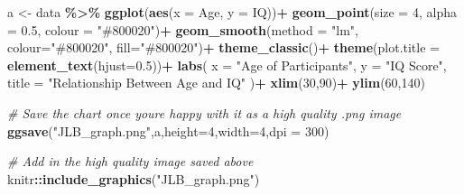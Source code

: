 \documentclass[
]{book}
\newenvironment{Shaded}{\begin{snugshade}}{\end{snugshade}}
\newcommand{\AttributeTok}[1]{\textcolor[rgb]{0.13,0.29,0.53}{#1}}
\newcommand{\CommentTok}[1]{\textcolor[rgb]{0.56,0.35,0.01}{\textit{#1}}}
\newcommand{\DecValTok}[1]{\textcolor[rgb]{0.00,0.00,0.81}{#1}}
\newcommand{\FloatTok}[1]{\textcolor[rgb]{0.00,0.00,0.81}{#1}}
\newcommand{\FunctionTok}[1]{\textcolor[rgb]{0.13,0.29,0.53}{\textbf{#1}}}
\newcommand{\NormalTok}[1]{#1}
\newcommand{\OtherTok}[1]{\textcolor[rgb]{0.56,0.35,0.01}{#1}}
\newcommand{\SpecialCharTok}[1]{\textcolor[rgb]{0.81,0.36,0.00}{\textbf{#1}}}
\newcommand{\StringTok}[1]{\textcolor[rgb]{0.31,0.60,0.02}{#1}}
\begin{document}
\begin{Shaded}
\begin{Highlighting}[]
\NormalTok{a }\OtherTok{\textless{}{-}}\NormalTok{ data }\SpecialCharTok{\%\textgreater{}\%}
  \FunctionTok{ggplot}\NormalTok{(}\FunctionTok{aes}\NormalTok{(}\AttributeTok{x =}\NormalTok{ Age, }\AttributeTok{y =}\NormalTok{ IQ))}\SpecialCharTok{+}
  \FunctionTok{geom\_point}\NormalTok{(}\AttributeTok{size =} \DecValTok{4}\NormalTok{, }\AttributeTok{alpha =} \FloatTok{0.5}\NormalTok{, }\AttributeTok{colour =} \StringTok{"\#800020"}\NormalTok{)}\SpecialCharTok{+}
  \FunctionTok{geom\_smooth}\NormalTok{(}\AttributeTok{method =} \StringTok{"lm"}\NormalTok{, }\AttributeTok{colour=}\StringTok{"\#800020"}\NormalTok{, }\AttributeTok{fill=}\StringTok{"\#800020"}\NormalTok{)}\SpecialCharTok{+}
  \FunctionTok{theme\_classic}\NormalTok{()}\SpecialCharTok{+}
  \FunctionTok{theme}\NormalTok{(}\AttributeTok{plot.title =} \FunctionTok{element\_text}\NormalTok{(}\AttributeTok{hjust=}\FloatTok{0.5}\NormalTok{))}\SpecialCharTok{+}
  \FunctionTok{labs}\NormalTok{(}
    \AttributeTok{x =} \StringTok{"Age of Participants"}\NormalTok{,}
    \AttributeTok{y =} \StringTok{"IQ Score"}\NormalTok{,}
    \AttributeTok{title =} \StringTok{"Relationship Between Age and IQ"}
\NormalTok{  )}\SpecialCharTok{+}
  \FunctionTok{xlim}\NormalTok{(}\DecValTok{30}\NormalTok{,}\DecValTok{90}\NormalTok{)}\SpecialCharTok{+}
  \FunctionTok{ylim}\NormalTok{(}\DecValTok{60}\NormalTok{,}\DecValTok{140}\NormalTok{)}

\CommentTok{\# Save the chart once you\textquotesingle{}re happy with it as a high quality .png image}
\FunctionTok{ggsave}\NormalTok{(}\StringTok{"JLB\_graph.png"}\NormalTok{,a,}\AttributeTok{height=}\DecValTok{4}\NormalTok{,}\AttributeTok{width=}\DecValTok{4}\NormalTok{,}\AttributeTok{dpi =} \DecValTok{300}\NormalTok{)}

\CommentTok{\# Add in the high quality image saved above }
\NormalTok{knitr}\SpecialCharTok{::}\FunctionTok{include\_graphics}\NormalTok{(}\StringTok{"JLB\_graph.png"}\NormalTok{)}
\end{Highlighting}
\end{Shaded}
\end{document}
